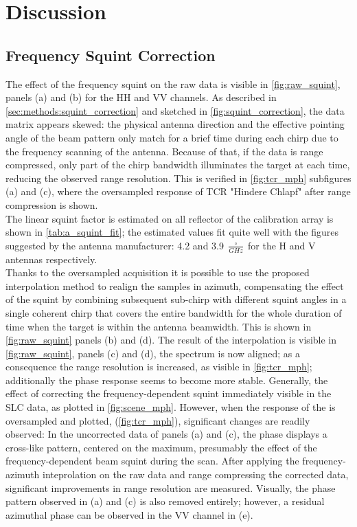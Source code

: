 \section{Discussion}\label{sec:discussion}
\subsection{Frequency Squint Correction}\label{sec:discussion:squint_correction}
The effect of the frequency squint on the raw data is visible in \autoref{fig:raw_squint}, panels (a) and (b) for the HH and VV channels. As described in 
\autoref{sec:methods:squint_correction} and sketched in \autoref{fig:squint_correction}, the data matrix appears skewed:  the physical antenna direction and the effective pointing angle of the beam pattern only match for a brief time during each chirp due to the frequency scanning of the antenna. Because of that, if the data is range compressed, only part of the chirp bandwidth illuminates the target at each time, reducing the observed range resolution. This is verified in \autoref{fig:tcr_mph} subfigures (a) and (c), where the oversampled response of TCR "Hindere Chlapf" after range compression is shown.\\
The linear squint factor is estimated on all reflector of the calibration array is shown in \autoref{tab:a_squint_fit};
the estimated values fit quite well with the figures suggested by the antenna manufacturer: 4.2 and 3.9 $\frac{\circ}{GHz}$ for the H and V antennas respectively.\\
Thanks to the oversampled acquisition it is possible to use the proposed interpolation method to realign the samples in azimuth, compensating the effect of the squint by combining subsequent sub-chirp with different squint angles in a single coherent chirp that covers the entire bandwidth for the whole duration of time when the target is within the antenna beamwidth. This is shown in \autoref{fig:raw_squint} panels (b) and (d). The result of the interpolation is visible in \autoref{fig:raw_squint}, panels (c) and (d), the spectrum is now aligned; as a consequence the range resolution is increased, as visible in \autoref{fig:tcr_mph}; additionally the phase response seems to become more stable.
Generally, the effect of correcting the frequency-dependent squint immediately visible in the SLC data, as plotted in \autoref{fig:scene_mph}. However, when the response of the  is oversampled and plotted, (\autoref{fig:tcr_mph}), significant changes are readily observed:
In the uncorrected data of panels (a) and (c), the phase displays a cross-like pattern, centered on the maximum, presumably the effect of the frequency-dependent beam squint during the scan. After applying the frequency-azimuth inteprolation on the raw data and range compressing the corrected data, significant improvements in range resolution are measured. Visually, the phase pattern observed in (a) and (c) is also removed entirely; however, a residual azimuthal phase can be observed in the VV channel in (e).
